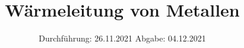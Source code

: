 

\subject{VERSUCH 204}
\title{Wärmeleitung von Metallen}
\date{%
  Durchführung: 26.11.2021
  \hspace{3em}
  Abgabe: 04.12.2021
}



\maketitle
\thispagestyle{empty}
\tableofcontents
\newpage







\printbibliography{}


